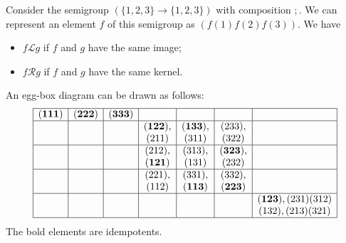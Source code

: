 \begin{example}
Consider the semigroup $(\{1,2,3\} \to \{1,2,3\})$ with composition $;$. We can represent an element $f$ of this semigroup as $(f(1) f(2) f(3))$. We have
\begin{itemize}
\item $f\mathcal{L}g$ if $f$ and $g$ have the same image;
\item $f\mathcal{R}g$ if $f$ and $g$ have the same kernel.
\end{itemize}
An egg-box diagram can be drawn as follows:
\[ \begin{array}{|c|c|c|c|c|c|c|}
\hline
\mathbf{(1 1 1)} & \mathbf{(2 2 2)} & \mathbf{(3 3 3)} &&& &  \\ \hline
&& & \mathbf{(1 2 2)}, & \mathbf{(1 3 3)}, & (2 3 3), &  \\
&& & (2 1 1)  & (3 1 1)  & (3 2 2)  &  \\ \hline
&& & (2 1 2), & (3 1 3), & \mathbf{(3 2 3)},  &  \\
&& & \mathbf{(1 2 1)}  & (1 3 1)  & (2 3 2)  &  \\ \hline
&& & (2 2 1), & (3 3 1), & (3 3 2),  &  \\
&& & (1 1 2)  & \mathbf{(1 1 3)}  & \mathbf{(2 2 3)}  &  \\ \hline
&& &&& & \mathbf{(1 2 3)}, (2 3 1) (3 1 2)  \\
&& &&& & (1 3 2), (2 1 3) (3 2 1)  \\ \hline
\end{array} \]
The bold elements are idempotents.
\end{example}


